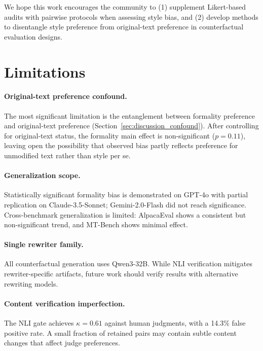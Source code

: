 \documentclass[11pt,a4paper]{article}
\begin{document}
We hope this work encourages the community to (1) supplement Likert-based audits with pairwise protocols when assessing style bias, and (2) develop methods to disentangle style preference from original-text preference in counterfactual evaluation designs.

\section*{Limitations}

\paragraph{Original-text preference confound.}
The most significant limitation is the entanglement between formality preference and original-text preference (Section~\ref{sec:discussion_confound}).
After controlling for original-text status, the formality main effect is non-significant ($p=0.11$), leaving open the possibility that observed bias partly reflects preference for unmodified text rather than style per se.

\paragraph{Generalization scope.}
Statistically significant formality bias is demonstrated on GPT-4o with partial replication on Claude-3.5-Sonnet; Gemini-2.0-Flash did not reach significance.
Cross-benchmark generalization is limited: AlpacaEval shows a consistent but non-significant trend, and MT-Bench shows minimal effect.

\paragraph{Single rewriter family.}
All counterfactual generation uses Qwen3-32B.
While NLI verification mitigates rewriter-specific artifacts, future work should verify results with alternative rewriting models.

\paragraph{Content verification imperfection.}
The NLI gate achieves $\kappa=0.61$ against human judgments, with a 14.3\% false positive rate.
A small fraction of retained pairs may contain subtle content changes that affect judge preferences.
\end{document}
